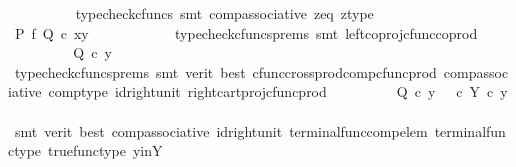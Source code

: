 \begin{isabellebody}
\ \ \ \ \ \ \ \ \isamarkupfalse%
\ {\isacharparenleft}{\kern0pt}typecheck{\isacharunderscore}{\kern0pt}cfuncs{\isacharcomma}{\kern0pt}\ smt\ comp{\isacharunderscore}{\kern0pt}associative{}\ z{\isacharunderscore}{\kern0pt}eq\ z{\isacharunderscore}{\kern0pt}type{\isacharparenright}{\kern0pt}\isanewline
\ \ \ \ \ \ \isamarkupfalse%
\ \isamarkupfalse%
\ {\isachardoublequoteopen}{\isacharparenleft}{\kern0pt}P\ {\isasymtimes}\isactrlsub f\ Q{\isacharparenright}{\kern0pt}\ {\isasymcirc}\isactrlsub c\ {\isasymlangle}x{\isacharcomma}{\kern0pt}y{\isasymrangle}\ {\isacharequal}{\kern0pt}\ {\isasymlangle}{\isasymt}{\isacharcomma}{\kern0pt}{\isasymt}{\isasymrangle}{\isachardoublequoteclose}\isanewline
\ \ \ \ \ \ \ \ \isamarkupfalse%
\ {\isacharparenleft}{\kern0pt}typecheck{\isacharunderscore}{\kern0pt}cfuncs{\isacharunderscore}{\kern0pt}prems{\isacharcomma}{\kern0pt}\ smt\ left{\isacharunderscore}{\kern0pt}coproj{\isacharunderscore}{\kern0pt}cfunc{\isacharunderscore}{\kern0pt}coprod{\isacharparenright}{\kern0pt}\isanewline
\ \ \ \ \ \ \isamarkupfalse%
\ \isamarkupfalse%
\ {\isachardoublequoteopen}Q\ {\isasymcirc}\isactrlsub c\ y\ {\isacharequal}{\kern0pt}\ {\isasymt}{\isachardoublequoteclose}\isanewline
\ \ \ \ \ \ \ \ \isamarkupfalse%
\ {\isacharparenleft}{\kern0pt}typecheck{\isacharunderscore}{\kern0pt}cfuncs{\isacharunderscore}{\kern0pt}prems{\isacharcomma}{\kern0pt}\ smt\ {\isacharparenleft}{\kern0pt}verit{\isacharcomma}{\kern0pt}\ best{\isacharparenright}{\kern0pt}\ cfunc{\isacharunderscore}{\kern0pt}cross{\isacharunderscore}{\kern0pt}prod{\isacharunderscore}{\kern0pt}comp{\isacharunderscore}{\kern0pt}cfunc{\isacharunderscore}{\kern0pt}prod\ comp{\isacharunderscore}{\kern0pt}associative{}\ comp{\isacharunderscore}{\kern0pt}type\ id{\isacharunderscore}{\kern0pt}right{\isacharunderscore}{\kern0pt}unit{}\ right{\isacharunderscore}{\kern0pt}cart{\isacharunderscore}{\kern0pt}proj{\isacharunderscore}{\kern0pt}cfunc{\isacharunderscore}{\kern0pt}prod{\isacharparenright}{\kern0pt}\isanewline
\ \ \ \ \ \ \isamarkupfalse%
\ \isamarkupfalse%
\ {\isachardoublequoteopen}Q\ {\isasymcirc}\isactrlsub c\ y\ {\isacharequal}{\kern0pt}\ {\isacharparenleft}{\kern0pt}{\isasymt}\ {\isasymcirc}\isactrlsub c\ {\isasymbeta}\isactrlbsub Y\isactrlesub {\isacharparenright}{\kern0pt}\ {\isasymcirc}\isactrlsub c\ y{\isachardoublequoteclose}\isanewline
\ \ \ \ \ \ \ \ \isamarkupfalse%
\ {\isacharparenleft}{\kern0pt}smt\ {\isacharparenleft}{\kern0pt}verit{\isacharcomma}{\kern0pt}\ best{\isacharparenright}{\kern0pt}\ comp{\isacharunderscore}{\kern0pt}associative{}\ id{\isacharunderscore}{\kern0pt}right{\isacharunderscore}{\kern0pt}unit{}\ terminal{\isacharunderscore}{\kern0pt}func{\isacharunderscore}{\kern0pt}comp{\isacharunderscore}{\kern0pt}elem\ terminal{\isacharunderscore}{\kern0pt}func{\isacharunderscore}{\kern0pt}type\ true{\isacharunderscore}{\kern0pt}func{\isacharunderscore}{\kern0pt}type\ y{\isacharunderscore}{\kern0pt}in{\isacharunderscore}{\kern0pt}Y{\isacharparenright}{\kern0pt}\isanewline

\end{isabellebody}
